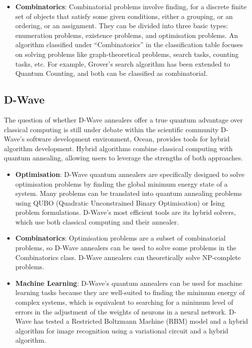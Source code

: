 \begin{itemize}
\item \textbf{Combinatorics}: Combinatorial problems involve finding, for a discrete finite set of objects that
  satisfy some given conditions, either a grouping, or an ordering, or an assignment. They can be divided into
  three basic types: enumeration problems, existence problems, and optimisation problems.
  An algorithm classified under “Combinatorics” in the classification table focuses on solving problems like
  graph-theoretical problems, search tasks, counting tasks, etc. For example, Grover’s search algorithm has been
  extended to Quantum Counting, and both can be classified as combinatorial.
\end{itemize}

\subsection{D-Wave}

The question of whether D-Wave annealers offer a true quantum advantage over classical computing is still under
debate within the scientific community
D-Wave's software development environment, Ocean, provides tools for hybrid algorithm development. Hybrid algorithms
combine classical computing with quantum annealing, allowing users to leverage the strengths of both approaches.

\begin{itemize}
\item \textbf{Optimisation}: D-Wave quantum annealers are specifically designed to solve optimisation problems by
  finding the global minimum energy state of a system. Many problems can be translated into quantum annealing problems
  using QUBO (Quadratic Unconstrained Binary Optimisation) or Ising problem formulations. D-Wave's most efficient tools
  are its hybrid solvers, which use both classical computing and their annealer.
  
\item \textbf{Combinatorics}: Optimisation problems are a subset of combinatorial problems, so D-Wave annealers can be
  used to solve some problems in the Combinatorics class.
  D-Wave annealers can theoretically solve NP-complete problems.

\item \textbf{Machine Learning}: D-Wave's quantum annealers can be used for machine learning tasks because they are
  well-suited to finding the minimum energy of complex systems, which is equivalent to searching for a minimum level
  of errors in the adjustment of the weights of neurons in a neural network.
  D-Wave has tested a Restricted Boltzmann Machine (RBM) model and a hybrid algorithm for image recognition using a
  variational circuit and a hybrid algorithm.
\end{itemize}
